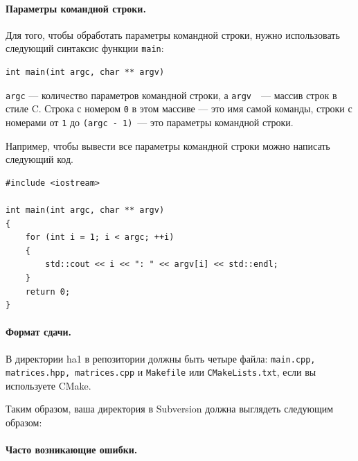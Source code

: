 \documentclass[a4paper,10pt]{article}
\begin{document}
\paragraph{Параметры командной строки.}
Для того, чтобы обработать параметры командной строки, нужно
использовать следующий синтаксис функции {\tt main}:
\begin{lstlisting}
int main(int argc, char ** argv)
\end{lstlisting}
{\tt argc} — количество параметров командной строки,
а  {\tt argv }~— массив строк в стиле C. Строка с номером
{\tt 0} в этом массиве — это имя самой команды,
строки с номерами от {\tt 1} до {\tt (argc - 1)}~—
это параметры командной строки.

Например, чтобы вывести все параметры командной строки
можно написать следующий код.
\begin{lstlisting}
#include <iostream>

int main(int argc, char ** argv)
{
    for (int i = 1; i < argc; ++i)
    {
        std::cout << i << ": " << argv[i] << std::endl;
    }
    return 0;
}
\end{lstlisting}

\paragraph{Формат сдачи.}
В директории ha1 в репозитории должны быть четыре файла:
{\tt main.cpp, matrices.hpp, matrices.cpp} и {\tt Makefile}
или {\tt CMakeLists.txt}, если вы используете CMake.

Таким образом, ваша директория в Subversion должна выглядеть следующим образом:

\paragraph{Часто возникающие ошибки.}
\end{document}
